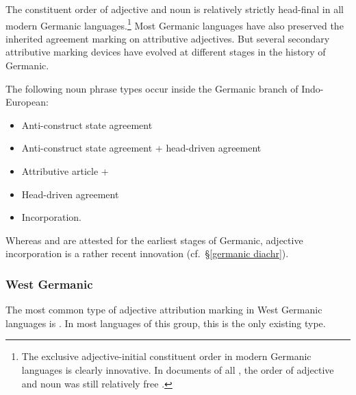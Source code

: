 The constituent order of adjective and noun is relatively strictly head-final in all modern Germanic languages.\footnote{The exclusive adjective-initial constituent order in modern Germanic languages is clearly innovative. In documents of all , the order of adjective and noun was still relatively free \citep[cf.][]{heinrichs1954}.} Most Germanic languages have also preserved the inherited agreement marking on attributive adjectives. But several secondary attributive marking devices have evolved at different stages in the history of Germanic.

The following noun phrase types occur inside the Germanic branch of Indo-European:
\begin{itemize}
\item{Anti\hyp{}construct state agreement}
\item{Anti\hyp{}construct state agreement + head\hyp{}driven agreement}
\item{Attributive article + }
\item{Head\hyp{}driven agreement}
\item{Incorporation.}
\end{itemize}
Whereas  and  are attested for the earliest stages of Germanic, adjective incorporation is a rather recent innovation (cf.~\S\ref{germanic diachr}).

\subsubsection{West Germanic}
\label{w-germanic synchr}
The most common type of adjective attribution marking in West Germanic languages is . In most languages of this group, this is the only existing type.

